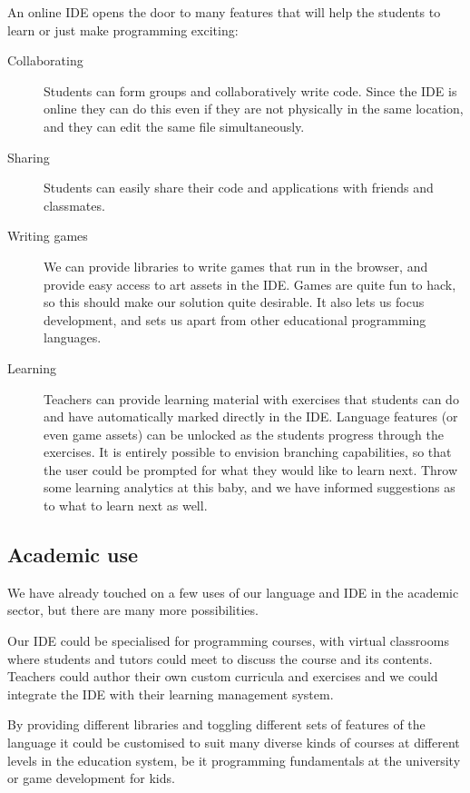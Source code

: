An online IDE opens the door to many features that will help the students to
learn or just make programming exciting:
\begin{description}
  \item[Collaborating]
    Students can form groups and collaboratively write code.  Since the IDE is
    online they can do this even if they are not physically in the same
    location, and they can edit the same file simultaneously.
  \item[Sharing]
    Students can easily share their code and applications with friends and
    classmates.
  \item[Writing games] 
    We can provide libraries to write games that run in the browser, and
    provide easy access to art assets in the IDE. Games are quite fun to hack, 
    so this should make our solution quite desirable. It also lets us focus 
    development, and sets us apart from other educational programming 
    languages.
  \item[Learning]
    Teachers can provide learning material with exercises that students can do
    and have automatically marked directly in the IDE. Language features (or
    even game assets) can be unlocked as the students progress through the
    exercises. It is entirely possible to envision branching capabilities, so 
    that the user could be prompted for what they would like to learn next. 
    Throw some learning analytics at this baby, and we have informed 
    suggestions as to what to learn next as well.
\end{description}

\subsection{Academic use}

We have already touched on a few uses of our language and IDE in the academic
sector, but there are many more possibilities.

Our IDE could be specialised for programming courses, with virtual classrooms
where students and tutors could meet to discuss the course and its contents.
Teachers could author their own custom curricula and exercises and we could
integrate the IDE with their learning management system.

By providing different libraries and toggling different sets of features of the
language it could be customised to suit many diverse kinds of courses at
different levels in the education system, be it programming fundamentals at the
university or game development for kids.

